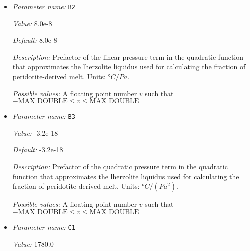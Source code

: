 \begin{itemize}
{\it Value:} 1475.0


{\it Default:} 1475.0


{\it Description:} Constant parameter in the quadratic function that approximates the lherzolite liquidus used for calculating the fraction of peridotite-derived melt. Units: $°C$.


{\it Possible values:} A floating point number $v$ such that $-\text{MAX\_DOUBLE} \leq v \leq \text{MAX\_DOUBLE}$
\item {\it Parameter name:} {\tt B2}
\label{parameters:Postprocess/Visualization/Melt fraction/B2}
\label{parameters:Postprocess/Visualization/Melt_20fraction/B2}


{\it Value:} 8.0e-8


{\it Default:} 8.0e-8


{\it Description:} Prefactor of the linear pressure term in the quadratic function that approximates the  lherzolite liquidus used for calculating the fraction of peridotite-derived melt. Units: $°C/Pa$.


{\it Possible values:} A floating point number $v$ such that $-\text{MAX\_DOUBLE} \leq v \leq \text{MAX\_DOUBLE}$
\item {\it Parameter name:} {\tt B3}
\label{parameters:Postprocess/Visualization/Melt fraction/B3}
\label{parameters:Postprocess/Visualization/Melt_20fraction/B3}


{\it Value:} -3.2e-18


{\it Default:} -3.2e-18


{\it Description:} Prefactor of the quadratic pressure term in the quadratic function that approximates the  lherzolite liquidus used for calculating the fraction of peridotite-derived melt. Units: $°C/(Pa^2)$.


{\it Possible values:} A floating point number $v$ such that $-\text{MAX\_DOUBLE} \leq v \leq \text{MAX\_DOUBLE}$
\item {\it Parameter name:} {\tt C1}
\label{parameters:Postprocess/Visualization/Melt fraction/C1}
\label{parameters:Postprocess/Visualization/Melt_20fraction/C1}


{\it Value:} 1780.0



\end{itemize}
